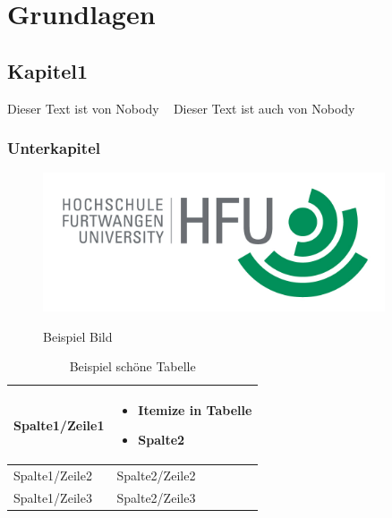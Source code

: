 \chapter{Grundlagen}

\section{Kapitel1}

Dieser Text ist von Nobody ~\cite{article}
Dieser Text ist auch von Nobody \cite{book}
\subsection{Unterkapitel}


\begin{figure}[htb!]
	\caption{Beispiel Bild}
	\includegraphics[width=0.9\textwidth]{content/pictures/hfu.jpg}
	\label{pic:label}
\end{figure}


\begin{footnotesize}
	\begin{longtable}[l]{|p{}|p{}|}
		\caption{Beispiel schöne Tabelle}
		\label{tab:label}
		\\
		\hline
		Spalte1/Zeile1	& 
		\begin{itemize}
			\item Itemize in Tabelle
			\item Spalte2
		\end{itemize} 
		\\ 
		\hline
		Spalte1/Zeile2	&   
		Spalte2/Zeile2
		\\
		\hline
		Spalte1/Zeile3	&    
		Spalte2/Zeile3
		\\
		\hline
	\end{longtable}
\end{footnotesize}

